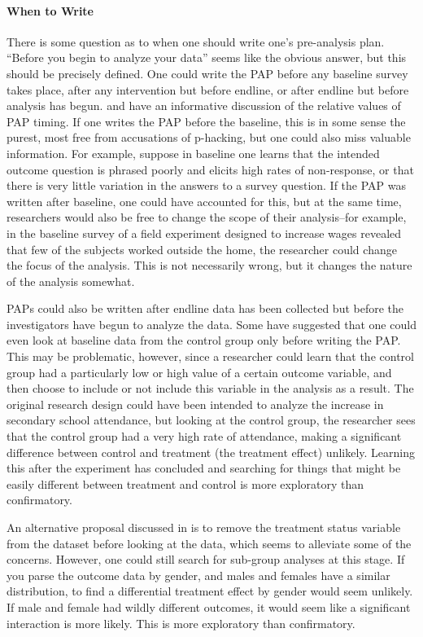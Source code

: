 \documentclass[12pt] {article}
\begin{document}
\paragraph{When to Write}
There is some question as to when one should write one's pre-analysis plan. ``Before you begin to analyze your data'' seems like the obvious answer, but this should be precisely defined. One could write the PAP before any baseline survey takes place, after any intervention but before endline, or after endline but before analysis has begun. \cite{glennerster_running_2013} and \cite{OlkenPAP} have an informative discussion of the relative values of PAP timing. If one writes the PAP before the baseline, this is in some sense the purest, most free from accusations of p-hacking, but one could also miss valuable information. For example, suppose in baseline one learns that the intended outcome question is phrased poorly and elicits high rates of non-response, or that there is very little variation in the answers to a survey question. If the PAP was written after baseline, one could have accounted for this, but at the same time, researchers would also be free to change the scope of their analysis--for example, in the baseline survey of a field experiment designed to increase wages revealed that few of the subjects worked outside the home, the researcher could change the focus of the analysis. This is not necessarily wrong, but it changes the nature of the analysis somewhat.

PAPs could also be written after endline data has been collected but before the investigators have begun to analyze the data. Some have suggested that one could even look at baseline data from the control group only before writing the PAP. This may be problematic, however, since a researcher could learn that the control group had a particularly low or high value of a certain outcome variable, and then choose to include or not include this variable in the analysis as a result. The original research design could have been intended to analyze the increase in secondary school attendance, but looking at the control group, the researcher sees that the control group had a very high rate of attendance, making a significant difference between control and treatment (the treatment effect) unlikely. Learning this after the experiment has concluded and searching for things that might be easily different between treatment and control is more exploratory than confirmatory. 

An alternative proposal discussed in \cite{OlkenPAP} is to remove the treatment status variable from the dataset before looking at the data, which seems to alleviate some of the concerns. However, one could still search for sub-group analyses at this stage. If you parse the outcome data by gender, and males and females have a similar distribution, to find a differential treatment effect by gender would seem unlikely. If male and female had wildly different outcomes, it would seem like a significant interaction is more likely. This is more exploratory than confirmatory. 
\end{document}
